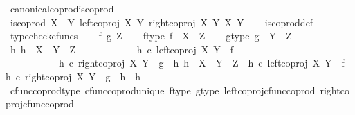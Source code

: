 \begin{isabellebody}
\isanewline
{}\isamarkupfalse%
\ canonical{\isacharunderscore}{\kern0pt}coprod{\isacharunderscore}{\kern0pt}is{\isacharunderscore}{\kern0pt}coprod{\isacharcolon}{\kern0pt}\isanewline
\ {\isachardoublequoteopen}is{\isacharunderscore}{\kern0pt}coprod\ {\isacharparenleft}{\kern0pt}X\ {\isasymCoprod}\ Y{\isacharparenright}{\kern0pt}\ {\isacharparenleft}{\kern0pt}left{\isacharunderscore}{\kern0pt}coproj\ X\ Y{\isacharparenright}{\kern0pt}\ {\isacharparenleft}{\kern0pt}right{\isacharunderscore}{\kern0pt}coproj\ X\ Y{\isacharparenright}{\kern0pt}\ X\ Y{\isachardoublequoteclose}\isanewline
%
\isadelimproof
\ \ %
\endisadelimproof
%
\isatagproof
{}\isamarkupfalse%
\ is{\isacharunderscore}{\kern0pt}coprod{\isacharunderscore}{\kern0pt}def\isanewline
{}\isamarkupfalse%
\ {\isacharparenleft}{\kern0pt}typecheck{\isacharunderscore}{\kern0pt}cfuncs{\isacharparenright}{\kern0pt}\isanewline
\ \ \isamarkupfalse%
\ f\ g\ Z\isanewline
\ \ \isamarkupfalse%
\ f{\isacharunderscore}{\kern0pt}type{\isacharcolon}{\kern0pt}\ {\isachardoublequoteopen}f\ {\isacharcolon}{\kern0pt}\ X\ {\isasymrightarrow}\ Z{\isachardoublequoteclose}\isanewline
\ \ \isamarkupfalse%
\ g{\isacharunderscore}{\kern0pt}type{\isacharcolon}{\kern0pt}\ {\isachardoublequoteopen}g\ {\isacharcolon}{\kern0pt}\ Y\ {\isasymrightarrow}\ Z{\isachardoublequoteclose}\isanewline
\ \ \isamarkupfalse%
\ {\isachardoublequoteopen}{\isasymexists}h{\isachardot}{\kern0pt}\ h\ {\isacharcolon}{\kern0pt}\ X\ {\isasymCoprod}\ Y\ {\isasymrightarrow}\ Z\ {\isasymand}\isanewline
\ \ \ \ \ \ \ \ \ \ \ h\ {\isasymcirc}\isactrlsub c\ left{\isacharunderscore}{\kern0pt}coproj\ X\ Y\ {\isacharequal}{\kern0pt}\ f\ {\isasymand}\isanewline
\ \ \ \ \ \ \ \ \ \ \ h\ {\isasymcirc}\isactrlsub c\ right{\isacharunderscore}{\kern0pt}coproj\ X\ Y\ {\isacharequal}{\kern0pt}\ g\ {\isasymand}\ {\isacharparenleft}{\kern0pt}{\isasymforall}h{}{\isachardot}{\kern0pt}\ h{}\ {\isacharcolon}{\kern0pt}\ X\ {\isasymCoprod}\ Y\ {\isasymrightarrow}\ Z\ {\isasymand}\ h{}\ {\isasymcirc}\isactrlsub c\ left{\isacharunderscore}{\kern0pt}coproj\ X\ Y\ {\isacharequal}{\kern0pt}\ f\ {\isasymand}\ h{}\ {\isasymcirc}\isactrlsub c\ right{\isacharunderscore}{\kern0pt}coproj\ X\ Y\ {\isacharequal}{\kern0pt}\ g\ {\isasymlongrightarrow}\ h{}\ {\isacharequal}{\kern0pt}\ h{\isacharparenright}{\kern0pt}{\isachardoublequoteclose}\isanewline
\ \ \ \ \isamarkupfalse%
\ cfunc{\isacharunderscore}{\kern0pt}coprod{\isacharunderscore}{\kern0pt}type\ cfunc{\isacharunderscore}{\kern0pt}coprod{\isacharunderscore}{\kern0pt}unique\ f{\isacharunderscore}{\kern0pt}type\ g{\isacharunderscore}{\kern0pt}type\ left{\isacharunderscore}{\kern0pt}coproj{\isacharunderscore}{\kern0pt}cfunc{\isacharunderscore}{\kern0pt}coprod\ right{\isacharunderscore}{\kern0pt}coproj{\isacharunderscore}{\kern0pt}cfunc{\isacharunderscore}{\kern0pt}coprod\ \isanewline

\end{isabellebody}
